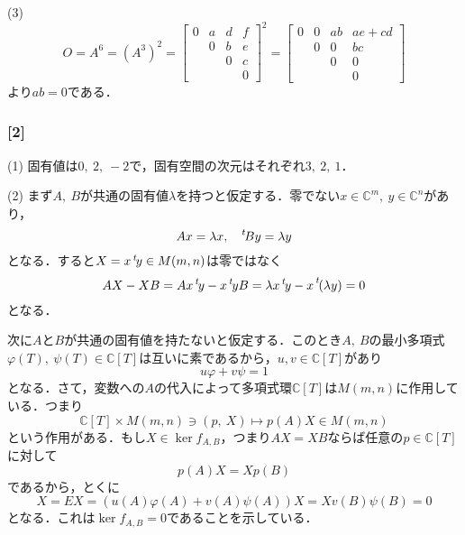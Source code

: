 \documentclass[a4j]{ltjsarticle}
\newcommand{\Cset}{\mathbb{C}}
\newcommand{\1}{\mathbbm{1}}
\newcommand{\transpose}[1]{\prescript{t\!}{}{#1}}
\numberwithin{equation}{section}
\theoremstyle{definition}
\begin{document}
(3) 
\begin{equation}
    O=A^6=(A^3)^2=\begin{bmatrix}
        0 & a & d & f \\
          & 0 & b & e \\
          &   & 0 & c \\
          &   &   & 0 
    \end{bmatrix}^2=\begin{bmatrix}
        0 & 0 & ab & ae+cd \\
          & 0 & 0  & bc \\
          &   & 0  & 0 \\
          &   &    & 0 
    \end{bmatrix}
\end{equation}
より$ab=0$である．

\subsubsection*{[2]}\label{am_2019_2}
(1) 固有値は$0,\ 2,\ -2$で，固有空間の次元はそれぞれ$3,\ 2,\ 1$．

(2) まず$A,\ B$が共通の固有値$\lambda$を持つと仮定する．零でない$x\in \Cset^m,\ y\in \Cset^n$があり，
\begin{equation}
    Ax=\lambda x,\quad \transpose{B}y=\lambda y    
\end{equation}
となる．すると$X=x\transpose{y}\in M(m,n)$は零ではなく
\begin{equation}
    AX-XB=Ax\transpose{y}-x\transpose{y}B=\lambda x\transpose{y}-x\transpose{(\lambda y)}=0
\end{equation}
となる．

次に$A$と$B$が共通の固有値を持たないと仮定する．このとき$A,\ B$の最小多項式$\varphi(T),\ \psi(T)\in \Cset[T]$は互いに素であるから，$u,v\in \Cset[T]$があり
\begin{equation}
    u\varphi+v\psi=1
\end{equation}
となる．さて，変数への$A$の代入によって多項式環$\Cset[T]$は$M(m,n)$に作用している．つまり
\begin{equation}
    \Cset[T]\times M(m,n)\ni(p,\ X)\mapsto p(A)X\in M(m,n)
\end{equation}
という作用がある．もし$X\in \ker f_{A,B}$，つまり$AX=XB$ならば任意の$p\in \Cset[T]$に対して
\begin{equation}
    p(A)X=X p(B)
\end{equation}
であるから，とくに
\begin{equation}
    X=EX=(u(A)\varphi(A)+v(A)\psi(A))X=Xv(B)\psi(B)=0 
\end{equation}
となる．これは$\ker f_{A,B}=0$であることを示している．
\end{document}
